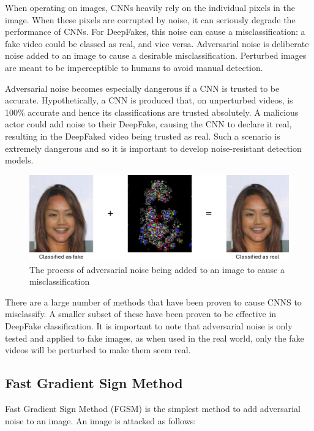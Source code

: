 When operating on images, CNNs heavily rely on the individual pixels in the image. When these pixels are corrupted by noise, it can seriously degrade the performance of CNNs\cite{yim2017enhancing}. For DeepFakes, this noise can cause a misclassification: a fake video could be classed as real, and vice versa. Adversarial noise is deliberate noise added to an image to cause a desirable misclassification. Perturbed images are meant to be imperceptible to humans to avoid manual detection.

Adversarial noise becomes especially dangerous if a CNN is trusted to be accurate. Hypothetically, a CNN is produced that, on unperturbed videos, is 100\% accurate and hence its classifications are trusted absolutely. A malicious actor could add noise to their DeepFake, causing the CNN to declare it real, resulting in the DeepFaked video being trusted as real. Such a scenario is extremely dangerous and so it is important to develop noise-resistant detection models.

\begin{figure}[H]
    \centering
    \includegraphics[width=0.75\linewidth]{dissertation//figures/noise.png}
    \caption{The process of adversarial noise being added to an image to cause a misclassification\cite{gandhi2020adversarial}}
    \label{fig:noise}
\end{figure}

There are a large number of methods that have been proven to cause CNNS to misclassify. A smaller subset of these have been proven to be effective in DeepFake classification. It is important to note that adversarial noise is only tested and applied to fake images, as when used in the real world, only the fake videos will be perturbed to make them seem real.

\subsection{Fast Gradient Sign Method}
\label{sec:fgsm}

Fast Gradient Sign Method (FGSM)\cite{goodfellow2014explaining} is the simplest method to add adversarial noise to an image. An image is attacked as follows:


